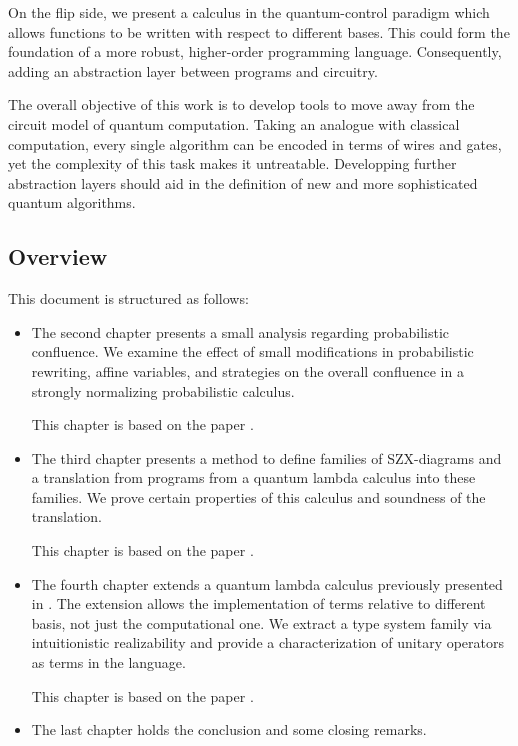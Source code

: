 On the flip side, we present a calculus in the quantum-control paradigm which
allows functions to be written with respect to different bases. This could form
the foundation of a more robust, higher-order programming language. Consequently,
adding an abstraction layer between programs and circuitry.

The overall objective of this work is to develop tools to move away from the
circuit model of quantum computation. Taking an analogue with classical computation,
every single algorithm can be encoded in terms of wires and gates, yet the
complexity of this task makes it untreatable. Developping further abstraction
layers should aid in the definition of new and more sophisticated quantum
algorithms.

\subsection{Overview}
This document is structured as follows:
\begin{itemize}
    \item The second chapter presents a small analysis regarding probabilistic
    confluence. We examine the effect of small modifications in probabilistic
    rewriting, affine variables, and strategies on the overall confluence in a
    strongly normalizing probabilistic calculus.
    
    This chapter is based on the paper \cite{Romero_2022}.

    \item The third chapter presents a method to define families of SZX-diagrams
    and a translation from programs from a quantum lambda calculus into these
    families. We prove certain properties of this calculus and soundness of the
    translation.
    
    This chapter is based on the paper \cite{Borgna_2023}.
    

    \item The fourth chapter extends a quantum lambda calculus previously presented
    in \cite{DiazcaroGuillermoMiquelValiron2019}. The extension allows the
    implementation of terms relative to different basis, not just the computational
    one. We extract a type system family via intuitionistic realizability and
    provide a characterization of unitary operators as terms in the language.
    
    This chapter is based on the paper \cite{Diazcaro_Malherbe_Romero_2025}.
    
    \item The last chapter holds the conclusion and some closing remarks.
\end{itemize}
